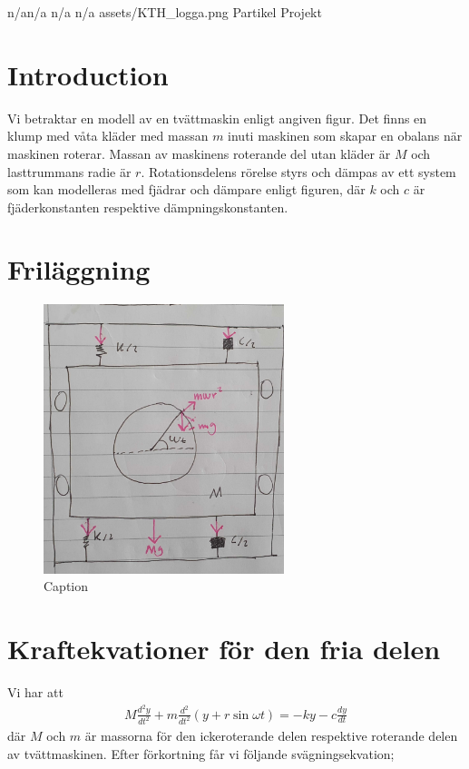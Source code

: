 \documentclass{assignment}
\begin{document}
\assignmentTitle
{n/a}{n/a}
{n/a}
{n/a}
{assets/KTH_logga.png}
{Partikel}
{Projekt}

\section{Introduction}

Vi betraktar en modell av en tvättmaskin enligt angiven figur. 
Det finns en klump med våta kläder med massan $m$ inuti maskinen som skapar en obalans när maskinen roterar. 
Massan av maskinens roterande del utan kläder är $M$ och lasttrummans radie är $r$. 
Rotationsdelens rörelse styrs och dämpas av ett system som kan modelleras med fjädrar och dämpare enligt figuren, där $k$ och $c$ är fjäderkonstanten respektive dämpningskonstanten.

\section{Friläggning}
\begin{figure}[!h]
    \centering
    \includegraphics[width = 70mm]{assets/diagram.jpg}
    \caption{Caption}
    \label{fig:my_label}
\end{figure}

\newpage
\section{Kraftekvationer för den fria delen}
Vi har att 
\begin{align}
    M \frac{d^2 y}{d t^2}+m \frac{d^2}{d t^2}(y+r \sin \omega t)=-k y-c \frac{d y}{d t}
\end{align}
där $M$ och $m$ är massorna för den ickeroterande delen respektive roterande delen av tvättmaskinen.
Efter förkortning får vi följande svägningsekvation;
\end{document}
